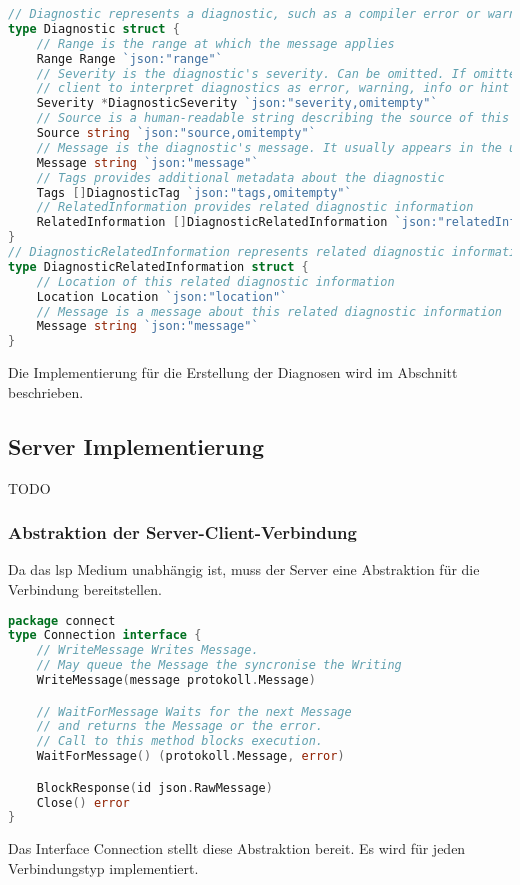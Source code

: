\documentclass[./einleitung.tex]{subfiles}
\begin{document}
    \begin{lstlisting}[language=Go, caption=Definition des Inhalts der Benachrichtigung, label=lst:diagnostics-result]
// Diagnostic represents a diagnostic, such as a compiler error or warning
type Diagnostic struct {
	// Range is the range at which the message applies
	Range Range `json:"range"`
	// Severity is the diagnostic's severity. Can be omitted. If omitted it is up to the
	// client to interpret diagnostics as error, warning, info or hint
	Severity *DiagnosticSeverity `json:"severity,omitempty"`
    // Source is a human-readable string describing the source of this diagnostic
	Source string `json:"source,omitempty"`
	// Message is the diagnostic's message. It usually appears in the user interface
	Message string `json:"message"`
	// Tags provides additional metadata about the diagnostic
	Tags []DiagnosticTag `json:"tags,omitempty"`
	// RelatedInformation provides related diagnostic information
	RelatedInformation []DiagnosticRelatedInformation `json:"relatedInformation,omitempty"`
}
// DiagnosticRelatedInformation represents related diagnostic information, such as related diagnostics
type DiagnosticRelatedInformation struct {
	// Location of this related diagnostic information
	Location Location `json:"location"`
	// Message is a message about this related diagnostic information
	Message string `json:"message"`
}
    \end{lstlisting}

    Die Implementierung für die Erstellung der Diagnosen wird im Abschnitt  beschrieben.
    \subsection{Server Implementierung}\label{subsec:server-implementierung}
       TODO
    \subsubsection{Abstraktion der Server-Client-Verbindung}
    Da das \acrshort{lsp} Medium unabhängig ist, muss der Server eine Abstraktion für die Verbindung bereitstellen.
    \begin{lstlisting}[language=Go]
package connect
type Connection interface {
	// WriteMessage Writes Message.
    // May queue the Message the syncronise the Writing
	WriteMessage(message protokoll.Message)

	// WaitForMessage Waits for the next Message
    // and returns the Message or the error.
	// Call to this method blocks execution.
	WaitForMessage() (protokoll.Message, error)

	BlockResponse(id json.RawMessage)
	Close() error
}
    \end{lstlisting}
    Das Interface Connection stellt diese Abstraktion bereit.
    Es wird für jeden Verbindungstyp implementiert.
\end{document}
